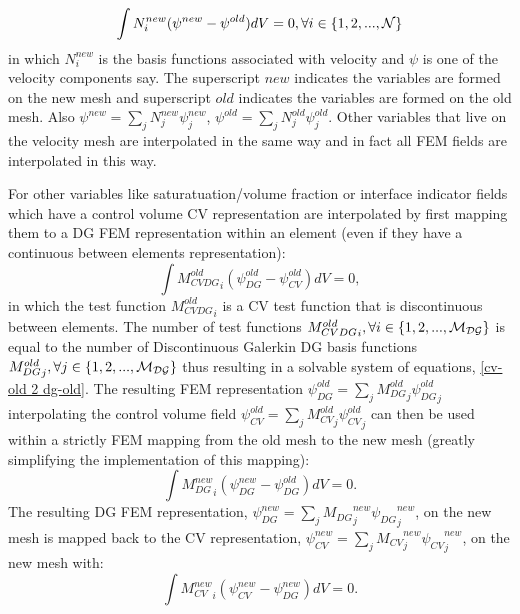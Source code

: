 \begin{equation}
\int N_i^{new} ( \psi^{new} -\psi^{old} ) dV=0, \forall i \in\{1,2,...,\cal{N} \}
\label{Vel-interpolation}
\end{equation}
in which $N_i^{new}$ is the basis functions associated with velocity and $\psi$ is one
of the velocity components say. The superscript $new$ indicates the variables are formed on the new mesh and
superscript $old$ indicates the variables are formed on the old mesh.
Also $\psi^{new}=\sum_j N_j^{new} \psi_j^{new}$,  $\psi^{old}=\sum_j N_j^{old} \psi_j^{old}$. Other variables that live on the velocity mesh are interpolated
in the same way and in fact all FEM fields are interpolated in this way.

For other variables like saturatuation/volume fraction or interface indicator fields which
have a control volume CV representation are interpolated by first mapping them to
a DG FEM representation within an element (even if they have a continuous between
elements representation):
\begin{equation}
\int {M_{CVDG}^{old}}_i (\psi_{DG}^{old} - \psi_{CV}^{old} ) dV =0,
\label{cv-old 2 dg-old}
\end{equation}
in which the test function ${M_{CVDG}^{old}}_i$ is a CV test function that is discontinuous between elements.
The number of test functions ${M_{CVDG}^{old}}_i, \forall i \in\{1,2,...,{\cal{M}_{DG}} \}$ is equal to the number of
Discontinuous Galerkin DG basis functions ${M_{DG}^{old}}_j, \forall j \in\{1,2,...,{\cal{M}_{DG}} \}$ thus resulting in a solvable system
of equations, \ref{cv-old 2 dg-old}.
The resulting FEM representation $\psi_{DG}^{old} =\sum_j {M_{DG}^{old}}_j {\psi_{DG}^{old}}_j$ interpolating
the control volume field $\psi_{CV}^{old} =\sum_j {M_{CV}^{old}}_j {\psi_{CV}^{old}}_j$  can
then be used within a strictly FEM mapping from the old mesh to the new mesh (greatly simplifying
the implementation of this mapping):
\begin{equation}
\int {M_{DG}^{new}}_i (\psi_{DG}^{new} - \psi_{DG}^{old} ) dV =0.
\label{dg-old 2 dg-new}
\end{equation}
The resulting DG FEM representation, $\psi_{DG}^{new}=\sum_j {M_{DG}}^{new}_j {\psi_{DG}}_j^{new}$, on the new mesh
is mapped back to the CV representation,
$\psi_{CV}^{new}=\sum_j {M_{CV}}^{new}_j {\psi_{CV}}_j^{new}$,
on the new mesh with:
\begin{equation}
\int {M_{CV}^{new}}_i (\psi_{CV}^{new} - \psi_{DG}^{new} ) dV =0.
\label{cv-new 2 dg-new}
\end{equation}
